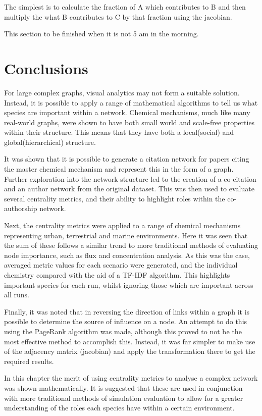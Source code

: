 The simplest is to calculate the fraction of A which contributes to B and then multiply the what B contributes to C by that fraction using the jacobian.

This section to be finished when it is not 5 am in the morning. 

\section{Conclusions}
For large complex graphs, visual analytics may not form a suitable solution. Instead, it is possible to apply a range of mathematical algorithms to tell us what species are important within a network. Chemical mechanisms, much like many real-world graphs, were shown to have both small world and scale-free properties within their structure. This means that they have both a local(social) and global(hierarchical) structure. 

It was shown that it is possible to generate a citation network for papers citing the master chemical mechanism and represent this in the form of a graph. Further exploration into the network structure led to the creation of a co-citation and an author network from the original dataset. This was then used to evaluate several centrality metrics, and their ability to highlight roles within the co-authorship network. 

Next, the centrality metrics were applied to a range of chemical mechanisms representing urban, terrestrial and marine environments. Here it was seen that the sum of these follows a similar trend to more traditional methods of evaluating node importance, such as flux and concentration analysis. As this was the case, averaged metric values for each scenario were generated, and the individual chemistry compared with the aid of a TF-IDF algorithm. This highlights important species for each run, whilst ignoring those which are important across all runs.

Finally, it was noted that in reversing the direction of links within a graph it is possible to determine the source of influence on a node. An attempt to do this using the PageRank algorithm was made, although this proved to not be the most effective method to accomplish this. Instead, it was far simpler to make use of the adjacency matrix (jacobian) and apply the transformation there to get the required results. 

In this chapter the merit of using centrality metrics to analyse a complex network was shown mathematically. It is suggested that these are used in conjunction with more traditional methods of simulation evaluation to allow for a greater understanding of the roles each species have within a certain environment. 

